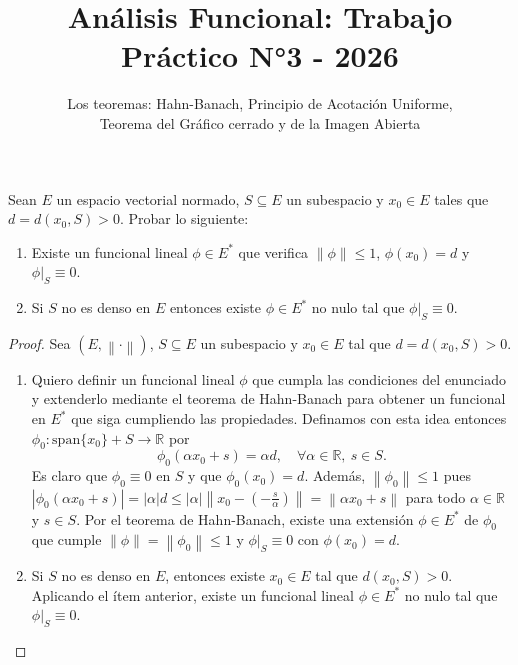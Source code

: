 \documentclass{article}
\theoremstyle{definition}
\newcommand{\R}{\mathbb{R}}
\newcommand{\norm}[1]{\left\lVert #1 \right\rVert}       %
\newcommand{\EN}[1][E]{(#1,\norm{\cdot})}                %
\newenvironment{ejercicio}[1]{\begin{trivlist}
\item[\hskip \labelsep {\bfseries Ejercicio}\hskip \labelsep {\bfseries #1.}]}{\end{trivlist}}
\begin{document}
\title{Análisis Funcional: Trabajo Práctico N°3 - 2026}
\author{Los teoremas: Hahn-Banach, Principio de Acotación Uniforme,\\Teorema del Gráfico cerrado y de la Imagen Abierta}

\maketitle

\begin{ejercicio}{1}
    Sean \(E\) un espacio vectorial normado, \( S\subseteq E \) un subespacio y \(x_0 \in E\) tales que \(d = d(x_{0},S) > 0\). Probar lo siguiente:
    \begin{enumerate}
        \item Existe un funcional lineal \(\phi\in E^{*}\) que verifica \(\norm{\phi}\le1\), \(\phi(x_{0})=d\) y \(\phi|_{S}\equiv0\).
        \item Si \(S\) no es denso en \(E\) entonces existe \(\phi\in E^{*}\) no nulo tal que \(\phi|_{S}\equiv0\).
    \end{enumerate}
\end{ejercicio}
\begin{proof}
    Sea \( \EN \), \( S \subseteq E \) un subespacio y \( x_0 \in E \) tal que \( d = d(x_0, S) > 0 \).\begin{enumerate}
        \item Quiero definir un funcional lineal \( \phi \) que cumpla las condiciones del enunciado y extenderlo mediante el teorema de Hahn-Banach para obtener un funcional en \( E^* \) que siga cumpliendo las propiedades. Definamos con esta idea entonces  \( \phi_0: \text{span}\{x_0\} + S \to \R \) por
              \[
                  \phi_0(\alpha x_0 + s) = \alpha d, \quad \forall \alpha \in \R, \ s \in S.
              \]
              Es claro que \( \phi_0 \equiv 0 \) en \( S \) y que \( \phi_0(x_0) = d \). Además, \( \norm{\phi_0} \le 1 \) pues \( |\phi_0(\alpha x_0 + s)| = |\alpha| d \le |\alpha| \norm{x_0 - (-\frac{s}{\alpha})} = \norm{\alpha x_0 + s} \) para todo \( \alpha \in \R \) y \( s \in S \). Por el teorema de Hahn-Banach, existe una extensión \( \phi \in E^* \) de \( \phi_0 \) que cumple \( \norm{\phi} = \norm{\phi_0} \le 1 \) y \( \phi|_S \equiv 0 \) con \( \phi(x_0) = d \).
        \item Si \( S \) no es denso en \( E \), entonces existe \( x_0 \in E \) tal que \( d(x_0, S) > 0 \). Aplicando el ítem anterior, existe un funcional lineal \( \phi \in E^* \) no nulo tal que \( \phi|_S \equiv 0 \).
    \end{enumerate}
\end{proof}
\end{document}
